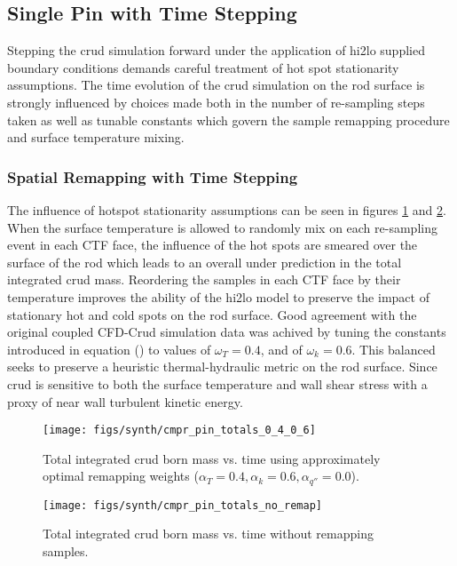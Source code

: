 \subsection{Single Pin with Time Stepping}

Stepping the crud simulation forward under the application of hi2lo supplied boundary conditions demands careful treatment of hot spot stationarity assumptions.  The time evolution of the crud simulation on the rod surface is strongly influenced by choices made both in the number of re-sampling steps taken as well as tunable constants which govern the sample remapping procedure and surface temperature mixing.

\subsubsection{Spatial Remapping with Time Stepping}

The influence of hotspot stationarity assumptions can be seen in figures \ref{fig:cmprpintotals0406} and \ref{fig:cmprpintotalsnoremap}.  When the surface temperature is allowed to randomly mix on each re-sampling event in each CTF face, the influence of the hot spots are smeared over the surface of the rod which leads to an overall under prediction in the total integrated crud mass.  Reordering the samples in each CTF face by their temperature improves the ability of the hi2lo model to preserve the impact of stationary hot and cold spots on the rod surface.  Good agreement with the original coupled CFD-Crud simulation data was achived by tuning the constants introduced in equation () to values of $\omega_T = 0.4$, and of $\omega_k = 0.6$.  This balanced seeks to preserve a heuristic thermal-hydraulic metric on the rod surface.  Since crud is sensitive to both the surface temperature and wall shear stress with a proxy of near wall turbulent kinetic energy.


\begin{figure}[H]
    \centering
    \texttt{[image: figs/synth/cmpr\_pin\_totals\_0\_4\_0\_6]}
    \caption[Total integrated crud born mass vs. time using approximately optimal remapping weights.]{Total integrated crud born mass vs. time using approximately optimal remapping weights ($\alpha_T=0.4, \alpha_{k}=0.6, \alpha_{q''}=0.0$).}
    \label{fig:cmprpintotals0406}
\end{figure}
\begin{figure}[H]
    \centering
    \texttt{[image: figs/synth/cmpr\_pin\_totals\_no\_remap]}
    \caption{Total integrated crud born mass vs. time without remapping samples.}
    \label{fig:cmprpintotalsnoremap}
\end{figure}

